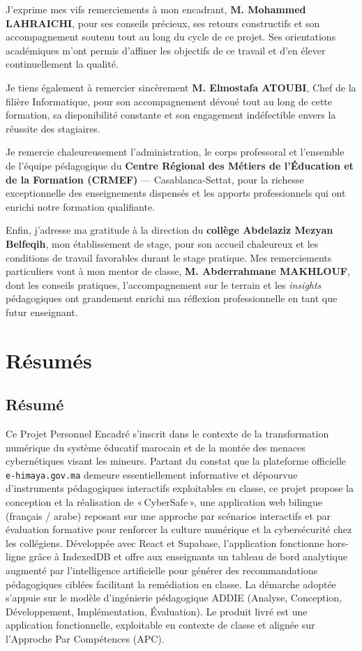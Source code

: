 \documentclass[12pt, a4paper, oneside]{report}
\newcommand{\encadrant}{M. Mohammed LAHRAICHI}
\begin{document}
J'exprime mes vifs remerciements à mon encadrant, \textbf{\encadrant}, pour ses conseils précieux, ses retours constructifs et son accompagnement soutenu tout au long du cycle de ce projet. Ses orientations académiques m'ont permis d'affiner les objectifs de ce travail et d'en élever continuellement la qualité.

Je tiens également à remercier sincèrement \textbf{M. Elmostafa ATOUBI}, Chef de la filière Informatique, pour son accompagnement dévoué tout au long de cette formation, sa disponibilité constante et son engagement indéfectible envers la réussite des stagiaires.

Je remercie chaleureusement l'administration, le corps professoral et l'ensemble de l'équipe pédagogique du \textbf{Centre Régional des Métiers de l'Éducation et de la Formation (CRMEF)} — Casablanca-Settat, pour la richesse exceptionnelle des enseignements dispensés et les apports professionnels qui ont enrichi notre formation qualifiante.

Enfin, j'adresse ma gratitude à la direction du \textbf{collège Abdelaziz Mezyan Belfeqih}, mon établissement de stage, pour son accueil chaleureux et les conditions de travail favorables durant le stage pratique. Mes remerciements particuliers vont à mon mentor de classe, \textbf{M. Abderrahmane MAKHLOUF}, dont les conseils pratiques, l'accompagnement sur le terrain et les \textit{insights} pédagogiques ont grandement enrichi ma réflexion professionnelle en tant que futur enseignant.

\chapter*{Résumés}

\section*{Résumé}
Ce Projet Personnel Encadré s'inscrit dans le contexte de la transformation numérique du système éducatif marocain et de la montée des menaces cybernétiques visant les mineurs. Partant du constat que la plateforme officielle \texttt{e-himaya.gov.ma} demeure essentiellement informative et dépourvue d'instruments pédagogiques interactifs exploitables en classe, ce projet propose la conception et la réalisation de «\,CyberSafe\,», une application web bilingue (français / arabe) reposant sur une approche par scénarios interactifs et par évaluation formative pour renforcer la culture numérique et la cybersécurité chez les collégiens. Développée avec React et Supabase, l'application fonctionne hors-ligne grâce à IndexedDB et offre aux enseignants un tableau de bord analytique augmenté par l'intelligence artificielle pour générer des recommandations pédagogiques ciblées facilitant la remédiation en classe. La démarche adoptée s'appuie sur le modèle d'ingénierie pédagogique ADDIE (Analyse, Conception, Développement, Implémentation, Évaluation). Le produit livré est une application fonctionnelle, exploitable en contexte de classe et alignée sur l'Approche Par Compétences (APC).
\end{document}
